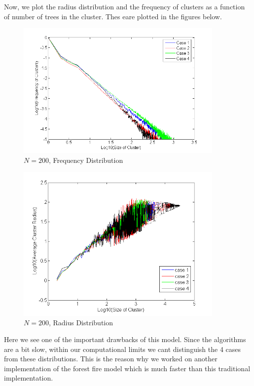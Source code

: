 \documentclass[11pt]{article}
\begin{document}
Now, we plot the radius distribution and the frequency of clusters as a function of number of trees in the cluster. Thes eare plotted in the figures below.


\begin{figure}[H]
\centering
\includegraphics[width=0.9\textwidth,keepaspectratio=true,]{Pictures/frequency_distribution_4_different_cases.png}
\caption{$N=200$, Frequency Distribution}
\end{figure}

\begin{figure}[H]
\centering
\includegraphics[width=0.9\textwidth,keepaspectratio=true,]{Pictures/radius_4_cases.png}
\caption{$N=200$, Radius Distribution}
\end{figure}

Here we see one of the important drawbacks of this model. Since the algorithms are a bit slow, within our computational limits we cant distinguish the 4 cases from these distributions. This is the reason why we worked on another implementation of the forest fire model which is much faster than this traditional implementation.
\end{document}
